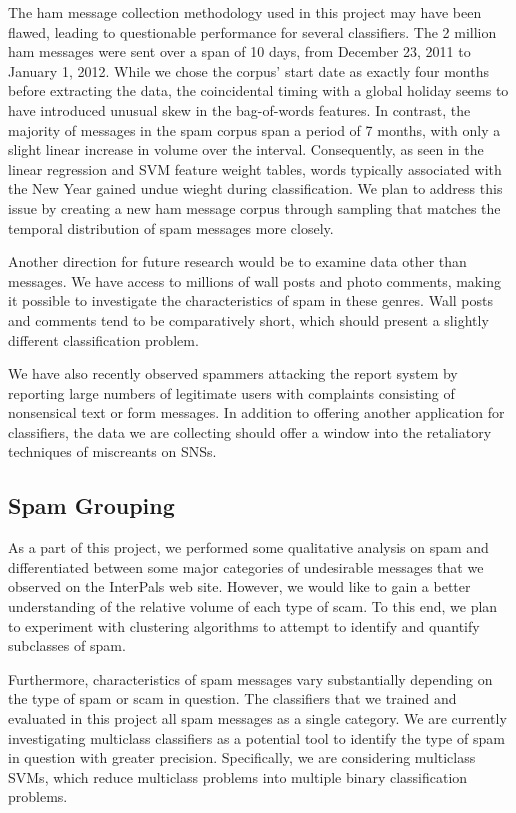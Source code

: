 \documentclass[preprint]{acm_proc_article-sp}
\begin{document}
The ham message collection methodology used in this project may have been flawed, leading to questionable 
performance for several classifiers. The 2 million ham messages were sent over a span of 10 days, from 
December 23, 2011 to January 1, 2012. While we chose the corpus' start date as exactly four months before 
extracting the data, the coincidental timing with a global holiday seems to have introduced unusual 
skew in the bag-of-words features. In contrast, the majority of messages in the spam corpus span a period of 
7 months, with only a slight linear increase in volume over the interval.  Consequently, as seen in 
the linear regression and SVM feature weight tables, words typically associated with the New Year gained 
undue wieght during classification.  We plan to address this issue by creating a new ham message corpus 
through sampling that matches the temporal distribution of spam messages more closely.

Another direction for future research would be to examine data other than messages. We have access to millions 
of wall posts and photo comments, making it possible to investigate the characteristics of spam in these genres. 
Wall posts and comments tend to be comparatively short, which should present a slightly different classification 
problem.

We have also recently observed spammers attacking the report system by reporting large numbers of legitimate users 
with complaints consisting of nonsensical text or form messages. In addition to offering another application for 
classifiers, the data we are collecting should offer a window into the retaliatory techniques of miscreants on 
SNSs.

\subsection{Spam Grouping}

As a part of this project, we performed some qualitative analysis on spam and differentiated between 
some major categories of undesirable messages that we observed on the InterPals web site. However, we would 
like to gain a better understanding of the relative volume of each type of scam. To this end, we plan to 
experiment with clustering algorithms to attempt to identify and quantify subclasses of spam. 

Furthermore, characteristics of spam messages vary substantially depending on the type of spam or scam in question. 
The classifiers that we trained and evaluated in this project all spam messages as a single category. We are currently 
investigating multiclass classifiers as a potential tool to identify the type of 
spam in question with greater precision. Specifically, we are considering multiclass SVMs, which reduce 
multiclass problems into multiple binary classification problems.\cite{duan} 
\end{document}
